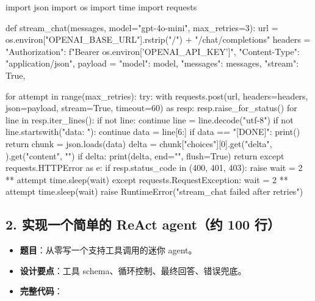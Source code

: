 \begin{codeblock}
import json
import os
import time
import requests


def stream_chat(messages, model="gpt-4o-mini", max_retries=3):
    url = os.environ["OPENAI_BASE_URL"].rstrip("/") + "/chat/completions"
    headers = {
        "Authorization": f"Bearer {os.environ['OPENAI_API_KEY']}",
        "Content-Type": "application/json",
    }
    payload = {
        "model": model,
        "messages": messages,
        "stream": True,
    }

    for attempt in range(max_retries):
        try:
            with requests.post(url, headers=headers, json=payload, stream=True, timeout=60) as resp:
                resp.raise_for_status()
                for line in resp.iter_lines():
                    if not line:
                        continue
                    line = line.decode("utf-8")
                    if not line.startswith("data: "):
                        continue
                    data = line[6:]
                    if data == "[DONE]":
                        print()
                        return
                    chunk = json.loads(data)
                    delta = chunk["choices"][0].get("delta", {}).get("content", "")
                    if delta:
                        print(delta, end="", flush=True)
                return
        except requests.HTTPError as e:
            if resp.status_code in (400, 401, 403):
                raise
            wait = 2 ** attempt
            time.sleep(wait)
        except requests.RequestException:
            wait = 2 ** attempt
            time.sleep(wait)
    raise RuntimeError("stream_chat failed after retries")
\end{codeblock}

\subsection{2. 实现一个简单的 ReAct agent（约 100 行）}
\begin{itemize}[leftmargin=2em]
\item \textbf{题目}：从零写一个支持工具调用的迷你 agent。
\item \textbf{设计要点}：工具 schema、循环控制、最终回答、错误兜底。
\item \textbf{完整代码}：
\end{itemize}

